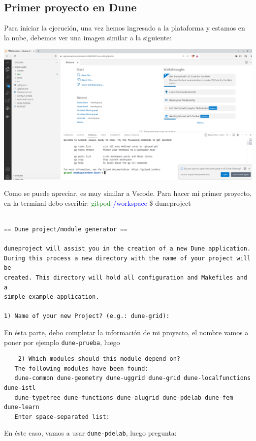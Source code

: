 \subsection[Primer Proyecto]{Primer proyecto en Dune}

Para iniciar la ejecución, una vez hemos ingresado a la plataforma y
estamos en la nube, debemos ver una imagen similar a la siguiente:

\begin{center}\label{fig:ingreso}
	\includegraphics[scale=0.3]{PantallaIngreso.png}
\end{center}
Como se puede apreciar, es muy similar a Vscode.  Para hacer mi primer proyecto, en la terminal debo escribir:
\textcolor{green}{gitpod} \textcolor{blue}{/workspace} \$ duneproject
\begin{verbatim}

== Dune project/module generator ==

duneproject will assist you in the creation of a new Dune application.
During this process a new directory with the name of your project will be
created. This directory will hold all configuration and Makefiles and a
simple example application.

1) Name of your new Project? (e.g.: dune-grid): 
\end{verbatim}
En ésta parte, debo completar la información de mi proyecto, el nombre vamos a poner por ejemplo \verb|dune-prueba|, luego
\begin{verbatim}
	2) Which modules should this module depend on?
   The following modules have been found:
   dune-common dune-geometry dune-uggrid dune-grid dune-localfunctions dune-istl 
   dune-typetree dune-functions dune-alugrid dune-pdelab dune-fem dune-learn 
   Enter space-separated list:
\end{verbatim}
En éste caso, vamos a usar \verb|dune-pdelab|, luego pregunta:
